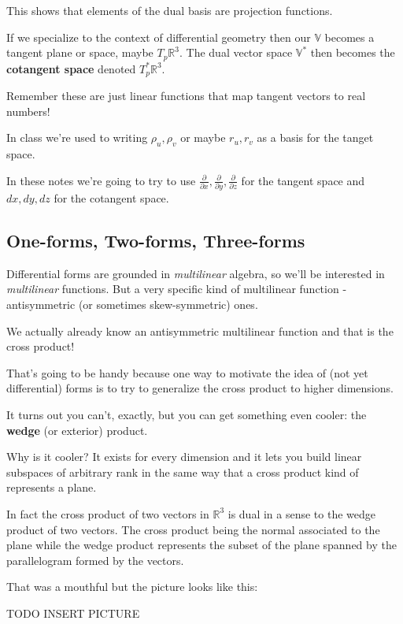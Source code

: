 \documentclass{article}
\begin{document}
This shows that elements of the dual basis are projection functions.

If we specialize to the context of differential geometry then our $\mathbb{V}$
becomes a tangent plane or space, maybe $T_{p}\mathbb{R}^{3}$. The dual vector space $\mathbb{V}^{*}$ then becomes the \textbf{cotangent space}
denoted $T_{p}^{*}\mathbb{R}^{3}$.

Remember these are just linear functions that
map tangent vectors to real numbers!

In class we're used to writing $\rho_{u}, \rho_{v}$ or maybe $r_{u}, r_{v}$ as a
basis for the tanget space.

In these notes we're going to try to use $\frac{\partial}{\partial x}, \frac{\partial}{\partial
  y}, \frac{\partial}{\partial z}$ for the tangent space and $dx, dy, dz$ for the cotangent space.

\subsection{One-forms, Two-forms, Three-forms}

Differential forms are grounded in \textit{multilinear} algebra, so we'll be
interested in \textit{multilinear} functions. But a very specific kind of
multilinear function - antisymmetric (or sometimes skew-symmetric) ones.

We actually already know an antisymmetric multilinear function and that is the
cross product!

That's going to be handy because one way to motivate the idea of (not yet
differential) forms is to try to generalize the cross product to higher
dimensions.

It turns out you can't, exactly, but you can get something even cooler: the
\textbf{wedge} (or exterior) product.

Why is it cooler? It exists for every dimension and it lets you build linear
subspaces of arbitrary rank in the same way that a cross product kind of
represents a plane.

In fact the cross product of two vectors in $\mathbb{R}^{3}$
is dual in a sense to the wedge product of two vectors. The cross product being
the normal associated to the plane while the wedge product represents the subset
of the plane spanned by the parallelogram formed by the vectors.

That was a mouthful but the picture looks like this:

TODO INSERT PICTURE
\end{document}

